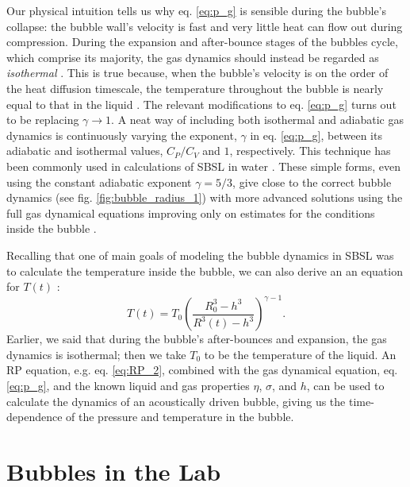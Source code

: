 \documentclass[11pt,prb,aps,nofootinbib,superscriptaddress,floatfix]{revtex4-2}
\begin{document}
Our physical intuition tells us why eq. \ref{eq:p_g} is sensible during the bubble's collapse: the bubble wall's velocity is fast and very little heat can flow out during compression. During the expansion and after-bounce stages of the bubbles cycle, which comprise its majority, the gas dynamics should instead be regarded as \emph{isothermal} \cite{brenner2002single}. This is true because, when the bubble's velocity is on the order of the heat diffusion timescale, the temperature throughout the bubble is nearly equal to that in the liquid \cite{prosperetti1999old,brenner2002single,yasui2018acoustic}. The relevant modifications to eq. \ref{eq:p_g} turns out to be replacing $\gamma\rightarrow 1$. A neat way of including both isothermal and adiabatic gas dynamics is continuously varying the exponent, $\gamma$ in eq. \ref{eq:p_g}, between its adiabatic and isothermal values, $C_P/C_V$ and $1$, respectively. This technique has been commonly used in calculations of SBSL in water \cite{hilgenfeldt1999simple,hilgenfeldt1999sonoluminescence,prosperetti1986bubble,brenner2002single}. These simple forms, even using the constant adiabatic exponent $\gamma=5/3$, give close to the correct bubble dynamics (see fig. \ref{fig:bubble_radius_1}) with more advanced solutions using the full gas dynamical equations improving only on estimates for the conditions inside the bubble \cite{brenner2002single,yasui2018acoustic}.

Recalling that one of main goals of modeling the bubble dynamics in SBSL was to calculate the temperature inside the bubble, we can also derive an an equation for $T(t)$ \cite{barber1997defining,brenner2002single,sivasubramanian2002temperature}:
\begin{equation}
    T(t) = T_0 \left( \frac{R_0^3-h^3}{R^3(t)-h^3} \right)^ {\gamma-1}.
    \label{eq:T(t)}
\end{equation}
Earlier, we said that during the bubble's after-bounces and expansion, the gas dynamics is isothermal; then we take $T_0$ to be the temperature of the liquid. An RP equation, e.g. eq. \ref{eq:RP_2}, combined with the gas dynamical equation, eq. \ref{eq:p_g}, and the known liquid and gas properties $\eta$, $\sigma$, and $h$, can be used to calculate the dynamics of an acoustically driven bubble, giving us the time-dependence of the pressure and temperature in the bubble. 

\section{Bubbles in the Lab}
\end{document}

